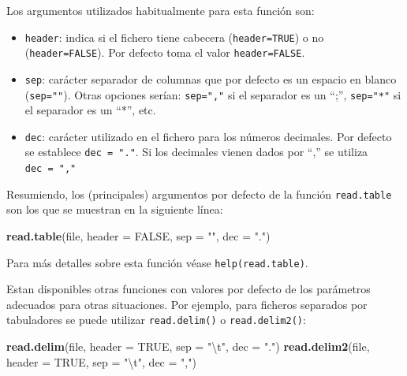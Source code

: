\documentclass[]{book}
\newenvironment{Shaded}{\begin{snugshade}}{\end{snugshade}}
\newcommand{\KeywordTok}[1]{\textcolor[rgb]{0.13,0.29,0.53}{\textbf{#1}}}
\newcommand{\DataTypeTok}[1]{\textcolor[rgb]{0.13,0.29,0.53}{#1}}
\newcommand{\CharTok}[1]{\textcolor[rgb]{0.31,0.60,0.02}{#1}}
\newcommand{\StringTok}[1]{\textcolor[rgb]{0.31,0.60,0.02}{#1}}
\newcommand{\OtherTok}[1]{\textcolor[rgb]{0.56,0.35,0.01}{#1}}
\newcommand{\NormalTok}[1]{#1}
\begin{document}
Los argumentos utilizados habitualmente para esta función son:

\begin{itemize}
\item
  \texttt{header}: indica si el fichero tiene cabecera
  (\texttt{header=TRUE}) o no (\texttt{header=FALSE}). Por defecto toma
  el valor \texttt{header=FALSE}.
\item
  \texttt{sep}: carácter separador de columnas que por defecto es un
  espacio en blanco (\texttt{sep=""}). Otras opciones serían:
  \texttt{sep=","} si el separador es un ``;'', \texttt{sep="*"} si el
  separador es un ``*'', etc.
\item
  \texttt{dec}: carácter utilizado en el fichero para los números
  decimales. Por defecto se establece \texttt{dec\ =\ "."}. Si los
  decimales vienen dados por ``,'' se utiliza \texttt{dec\ =\ ","}
\end{itemize}

Resumiendo, los (principales) argumentos por defecto de la función
\texttt{read.table} son los que se muestran en la siguiente línea:

\begin{Shaded}
\begin{Highlighting}[]
\KeywordTok{read.table}\NormalTok{(file, }\DataTypeTok{header =} \OtherTok{FALSE}\NormalTok{, }\DataTypeTok{sep =} \StringTok{""}\NormalTok{, }\DataTypeTok{dec =} \StringTok{"."}\NormalTok{)  }
\end{Highlighting}
\end{Shaded}

Para más detalles sobre esta función véase \texttt{help(read.table)}.

Estan disponibles otras funciones con valores por defecto de los
parámetros adecuados para otras situaciones. Por ejemplo, para ficheros
separados por tabuladores se puede utilizar \texttt{read.delim()} o
\texttt{read.delim2()}:

\begin{Shaded}
\begin{Highlighting}[]
\KeywordTok{read.delim}\NormalTok{(file, }\DataTypeTok{header =} \OtherTok{TRUE}\NormalTok{, }\DataTypeTok{sep =} \StringTok{"}\CharTok{\textbackslash{}t}\StringTok{"}\NormalTok{, }\DataTypeTok{dec =} \StringTok{"."}\NormalTok{)}
\KeywordTok{read.delim2}\NormalTok{(file, }\DataTypeTok{header =} \OtherTok{TRUE}\NormalTok{, }\DataTypeTok{sep =} \StringTok{"}\CharTok{\textbackslash{}t}\StringTok{"}\NormalTok{, }\DataTypeTok{dec =} \StringTok{","}\NormalTok{)}
\end{Highlighting}
\end{Shaded}
\end{document}
